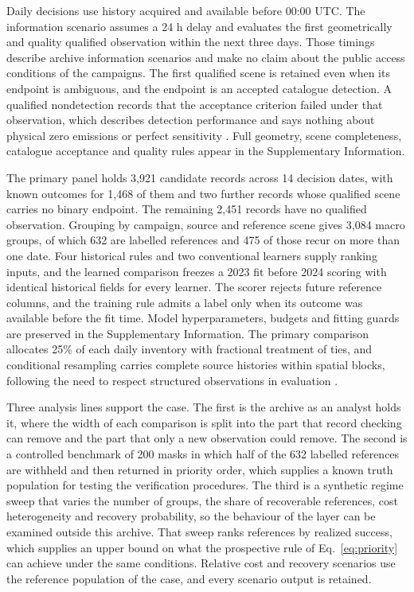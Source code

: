 \documentclass[a4paper,fleqn,longmktitle]{cas-sc}
\begin{document}
Daily decisions use history acquired and available before 00:00 UTC. The information scenario assumes a 24 h delay and evaluates the first geometrically and quality qualified observation within the next three days. Those timings describe archive information scenarios and make no claim about the public access conditions of the campaigns. The first qualified scene is retained even when its endpoint is ambiguous, and the endpoint is an accepted catalogue detection. A qualified nondetection records that the acceptance criterion failed under that observation, which describes detection performance and says nothing about physical zero emissions or perfect sensitivity \citep{ayasse2024}. Full geometry, scene completeness, catalogue acceptance and quality rules appear in the Supplementary Information.

The primary panel holds 3,921 candidate records across 14 decision dates, with known outcomes for 1,468 of them and two further records whose qualified scene carries no binary endpoint. The remaining 2,451 records have no qualified observation. Grouping by campaign, source and reference scene gives 3,084 macro groups, of which 632 are labelled references and 475 of those recur on more than one date. Four historical rules and two conventional learners supply ranking inputs, and the learned comparison freezes a 2023 fit before 2024 scoring with identical historical fields for every learner. The scorer rejects future reference columns, and the training rule admits a label only when its outcome was available before the fit time. Model hyperparameters, budgets and fitting guards are preserved in the Supplementary Information. The primary comparison allocates 25\% of each daily inventory with fractional treatment of ties, and conditional resampling carries complete source histories within spatial blocks, following the need to respect structured observations in evaluation \citep{roberts2017}.

Three analysis lines support the case. The first is the archive as an analyst holds it, where the width of each comparison is split into the part that record checking can remove and the part that only a new observation could remove. The second is a controlled benchmark of 200 masks in which half of the 632 labelled references are withheld and then returned in priority order, which supplies a known truth population for testing the verification procedures. The third is a synthetic regime sweep that varies the number of groups, the share of recoverable references, cost heterogeneity and recovery probability, so the behaviour of the layer can be examined outside this archive. That sweep ranks references by realized success, which supplies an upper bound on what the prospective rule of Eq.~\eqref{eq:priority} can achieve under the same conditions. Relative cost and recovery scenarios use the reference population of the case, and every scenario output is retained.
\end{document}
